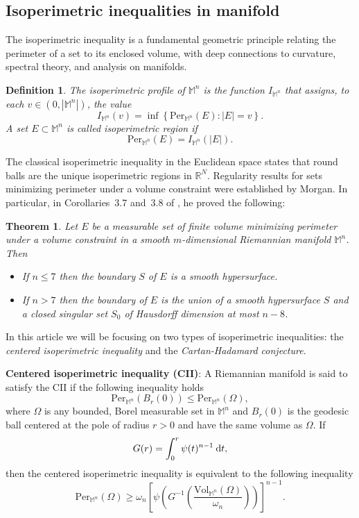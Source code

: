 \documentclass[a4paper,11pt,reqno]{amsart}
\theoremstyle{plain}
\newtheorem{theorem}{Theorem}[section]
\newtheorem{definition}{Definition}[section]
\numberwithin{equation}{section} \allowdisplaybreaks
\newcommand{\m}{\mathbb{M}^n}
\newcommand{\dt}{\:{\rm d}t}
\newcommand{\uv}{\omega_n}
\begin{document}
\subsection{Isoperimetric inequalities in manifold} The isoperimetric inequality is a fundamental geometric principle relating the perimeter of a set to its enclosed volume, with deep connections to curvature, spectral theory, and analysis on manifolds.
\begin{definition}
    The isoperimetric profile of $\m$ is the function $I_{\m}$ that assigns, to each $v\in (0,|\m|)$, the value 
    \begin{equation*}
        I_{\m}(v)= \inf\left\{\mathrm{Per}_{\m}(E): |E|=v\right\}.
    \end{equation*}
    A set $E\subset \m$ is called isoperimetric region if
    $$\mathrm{Per}_{\m}(E)=I_{\m}(|E|).$$
\end{definition}
The classical isoperimetric inequality in the Euclidean space states that round balls are the unique isoperimetric regions in $\mathbb{R}^N$. Regularity results for sets minimizing perimeter under a volume constraint were established by Morgan. In particular, in Corollaries~3.7 and~3.8 of \cite{Morgan}, he proved the following:

\begin{theorem}
    Let $E$ be a measurable set of finite volume minimizing perimeter under a volume constraint in a smooth $m$-dimensional Riemannian manifold $\m$. Then
    \begin{itemize}
        \item[(i)] If $n\leq 7$ then the boundary $S$ of $E$ is a smooth hypersurface.
        \medskip
        \item[(ii)] If $n>7$ then the boundary of $E$ is the union of a smooth hypersurface $S$ and a closed singular set $S_0$ of Hausdorff dimension at most $n-8$.
    \end{itemize}
\end{theorem}
In this article we will be focusing on two types of isoperimetric inequalities: the \emph{centered isoperimetric inequality} and the \emph{Cartan-Hadamard conjecture}.

\medskip 
\textbf{Centered isoperimetric inequality (CII)}: A Riemannian manifold is said to satisfy the CII if the following inequality holds
\begin{equation}\label{Cenetered}
    \text{Per}_{\m}(B_r(0))\leq \text{Per}_{\m}(\Omega),
\end{equation}
where $\Omega$ is any bounded, Borel measurable set in $\m$ and $B_r(0)$ is the geodesic ball centered at the pole of radius $r>0$ and have the same volume as $\Omega$.
If 
\begin{equation*}
    G(r)=\int_0^r\psi(t)^{n-1}\dt,
\end{equation*}
then the centered isoperimetric inequality is equivalent to the following inequality
\begin{equation}\label{CII}
    \text{Per}_{\m}(\Omega) \geq \uv\left[\psi \left(G^{-1}\left(\frac{\text{Vol}_{\m}(\Omega)}{\uv}\right)\right)\right]^{n-1}.
\end{equation}
\end{document}
